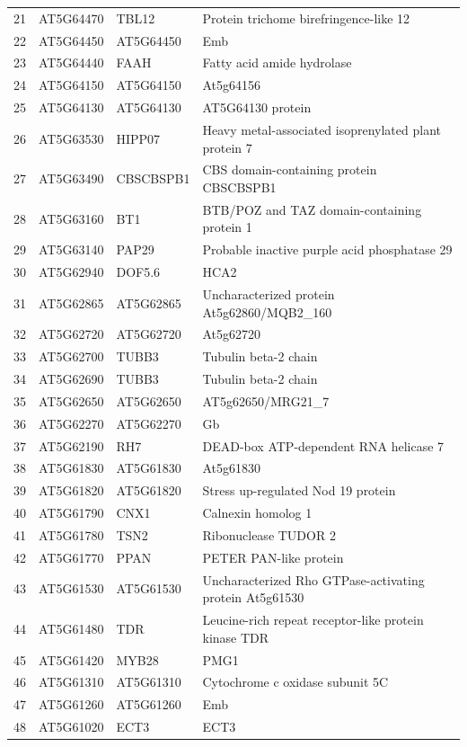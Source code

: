 \documentclass[11pt]{article}
\begin{document}
\begin{center}
\begin{tabular}{rlll}
21 & AT5G64470 & TBL12 & Protein trichome birefringence-like 12\\
22 & AT5G64450 & AT5G64450 & Emb\\
23 & AT5G64440 & FAAH & Fatty acid amide hydrolase\\
24 & AT5G64150 & AT5G64150 & At5g64156\\
25 & AT5G64130 & AT5G64130 & AT5G64130 protein\\
26 & AT5G63530 & HIPP07 & Heavy metal-associated isoprenylated plant protein 7\\
27 & AT5G63490 & CBSCBSPB1 & CBS domain-containing protein CBSCBSPB1\\
28 & AT5G63160 & BT1 & BTB/POZ and TAZ domain-containing protein 1\\
29 & AT5G63140 & PAP29 & Probable inactive purple acid phosphatase 29\\
30 & AT5G62940 & DOF5.6 & HCA2\\
31 & AT5G62865 & AT5G62865 & Uncharacterized protein At5g62860/MQB2\_160\\
32 & AT5G62720 & AT5G62720 & At5g62720\\
33 & AT5G62700 & TUBB3 & Tubulin beta-2 chain\\
34 & AT5G62690 & TUBB3 & Tubulin beta-2 chain\\
35 & AT5G62650 & AT5G62650 & AT5g62650/MRG21\_7\\
36 & AT5G62270 & AT5G62270 & Gb\\
37 & AT5G62190 & RH7 & DEAD-box ATP-dependent RNA helicase 7\\
38 & AT5G61830 & AT5G61830 & At5g61830\\
39 & AT5G61820 & AT5G61820 & Stress up-regulated Nod 19 protein\\
40 & AT5G61790 & CNX1 & Calnexin homolog 1\\
41 & AT5G61780 & TSN2 & Ribonuclease TUDOR 2\\
42 & AT5G61770 & PPAN & PETER PAN-like protein\\
43 & AT5G61530 & AT5G61530 & Uncharacterized Rho GTPase-activating protein At5g61530\\
44 & AT5G61480 & TDR & Leucine-rich repeat receptor-like protein kinase TDR\\
45 & AT5G61420 & MYB28 & PMG1\\
46 & AT5G61310 & AT5G61310 & Cytochrome c oxidase subunit 5C\\
47 & AT5G61260 & AT5G61260 & Emb\\
48 & AT5G61020 & ECT3 & ECT3\\

\end{tabular}
\end{center}
\end{document}
